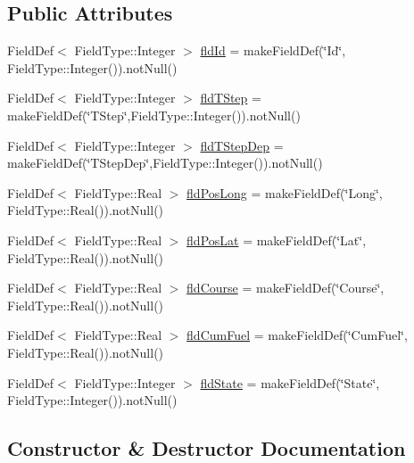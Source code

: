 \subsection*{Public Attributes}
\begin{DoxyCompactItemize}
\item 
Field\+Def$<$ Field\+Type\+::\+Integer $>$ \mbox{\hyperlink{class_vessel_vms_like_table_a87f903e5516aaccb43c1ea6e90c0a923}{fld\+Id}} = make\+Field\+Def(\char`\"{}Id\char`\"{}, Field\+Type\+::\+Integer()).not\+Null()
\item 
Field\+Def$<$ Field\+Type\+::\+Integer $>$ \mbox{\hyperlink{class_vessel_vms_like_table_a5e10f870c3b87126c01b1b953dea9876}{fld\+T\+Step}} = make\+Field\+Def(\char`\"{}T\+Step\char`\"{},Field\+Type\+::\+Integer()).not\+Null()
\item 
Field\+Def$<$ Field\+Type\+::\+Integer $>$ \mbox{\hyperlink{class_vessel_vms_like_table_a3d33393b14a942cca454354db1aa73a3}{fld\+T\+Step\+Dep}} = make\+Field\+Def(\char`\"{}T\+Step\+Dep\char`\"{},Field\+Type\+::\+Integer()).not\+Null()
\item 
Field\+Def$<$ Field\+Type\+::\+Real $>$ \mbox{\hyperlink{class_vessel_vms_like_table_a07f5fde6d95b76f05b95fa9f462a69d5}{fld\+Pos\+Long}} = make\+Field\+Def(\char`\"{}Long\char`\"{}, Field\+Type\+::\+Real()).not\+Null()
\item 
Field\+Def$<$ Field\+Type\+::\+Real $>$ \mbox{\hyperlink{class_vessel_vms_like_table_a115196d529d843c8f9d09cb46273ee49}{fld\+Pos\+Lat}} = make\+Field\+Def(\char`\"{}Lat\char`\"{}, Field\+Type\+::\+Real()).not\+Null()
\item 
Field\+Def$<$ Field\+Type\+::\+Real $>$ \mbox{\hyperlink{class_vessel_vms_like_table_aa235f51c2df9c69e96b327193a28dfb3}{fld\+Course}} = make\+Field\+Def(\char`\"{}Course\char`\"{}, Field\+Type\+::\+Real()).not\+Null()
\item 
Field\+Def$<$ Field\+Type\+::\+Real $>$ \mbox{\hyperlink{class_vessel_vms_like_table_ad06a099f3e8d2fec045bcd990fb81650}{fld\+Cum\+Fuel}} = make\+Field\+Def(\char`\"{}Cum\+Fuel\char`\"{}, Field\+Type\+::\+Real()).not\+Null()
\item 
Field\+Def$<$ Field\+Type\+::\+Integer $>$ \mbox{\hyperlink{class_vessel_vms_like_table_a2cbcedc208e696f8f73f41bd376e420b}{fld\+State}} = make\+Field\+Def(\char`\"{}State\char`\"{}, Field\+Type\+::\+Integer()).not\+Null()
\end{DoxyCompactItemize}


\subsection{Constructor \& Destructor Documentation}
\mbox{\label{class_vessel_vms_like_table_aebec4687c66172a5ba85319f4f51fb17}} 
